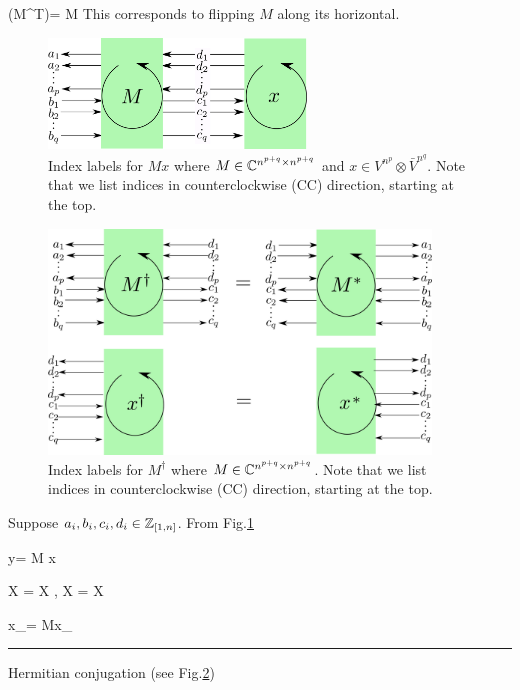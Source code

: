 \beq
(M^T)= M
\eeq
This corresponds to flipping $M$ 
along its horizontal.

\begin{figure}[h!]
\centering
\includegraphics[width=2.7in]
{conventions/index-labels-Mx.png}
\caption{Index labels for $Mx$
where $M
\in { \mathbb{C}}^{n^{p+q}\times n^{p+q}}$ and
$x\in V^{n^p}\otimes \bar{V}^{n^q}$.
Note that we  list indices in counterclockwise (CC) direction, 
starting at the top.}
\label{fig-index-labels-Mx}
\end{figure}

\begin{figure}[h!]
\centering
\includegraphics[width=4in]
{conventions/index-labels-hermitian.png}
\caption{Index labels for $M^\dagger$
where $M
\in { \mathbb{C}}^{n^{p+q}\times n^{p+q}}$.
Note that we  list indices in counterclockwise (CC) direction, 
starting at the top.}
\label{fig-index-labels-hermitian}
\end{figure}


Suppose $a_i, b_i, c_i, d_i\in {\mathbb{Z}}_{[1,n]}$.
From Fig.\ref{fig-index-labels-Mx}

\beq
y=
M
x
\eeq

\beq
X\indices{_\alp} = X
,\quad
X\indices{^\alp}
=
X
\eeq

\beq
x_\alp = M\indices{_\alp^\beta}x_\beta
\eeq


\hrule

Hermitian conjugation (see Fig.\ref{fig-index-labels-hermitian})

